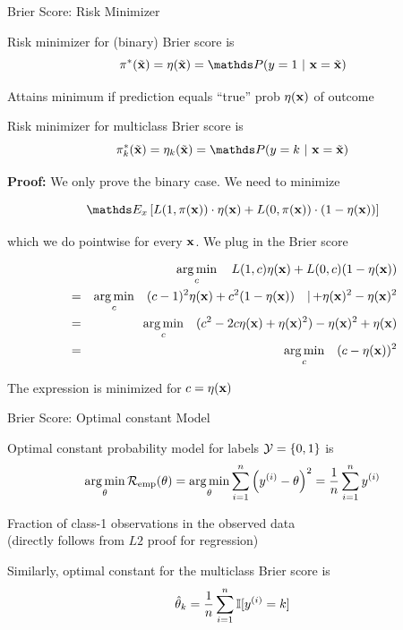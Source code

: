 \documentclass[11pt,compress,t,notes=noshow, xcolor=table]{beamer}
\begin{document}
\begin{vbframe}{Brier Score: Risk Minimizer}

\begin{itemizeL}
    \item Risk minimizer for (binary) Brier score is $$\piastxtil = \eta(\xtil) = \P(y=1~|~\xv = \xtil)$$
    \item Attains minimum if prediction equals \enquote{true} prob $\eta(\mathbf{x})$ of outcome
    \item Risk minimizer for multiclass Brier score is 
$$\pi^{\ast}_k(\xtil) = \eta_k(\xtil) =  \P(y = k ~|~ \xv = \xtil) $$
\end{itemizeL}

\framebreak
\textbf{Proof: } We only prove the binary case. We need to minimize 

$$
\E_x \left[L(1, \pix) \cdot \eta(\xv) + L(0, \pix) \cdot (1 - \eta(\xv)) \right]
$$

which we do pointwise for every $\mathbf{x}$. We plug in the Brier score

\vspace*{-0.3cm}

\begin{eqnarray*}
	&& \mathop{\mathrm{arg\,min}}_c \quad L(1, c) \eta(\mathbf{x}) + L(0, c) (1 - \eta(\mathbf{x})) \\ 
	&=&  \mathop{\mathrm{arg\,min}}_c \quad (c - 1)^2 \eta(\mathbf{x}) + c^2 (1 - \eta(\mathbf{x}))  \quad |{\,+\eta(\mathbf{x})^2-\eta(\mathbf{x})^2}\\
  &=&  \mathop{\mathrm{arg\,min}}_c \quad (c^2 -2c\eta(\mathbf{x}) + \eta(\mathbf{x})^2)- \eta(\mathbf{x})^2 + \eta(\mathbf{x}) \\
	&=&  \mathop{\mathrm{arg\,min}}_c \quad (c - \eta(\mathbf{x}))^2
\end{eqnarray*}

The expression is minimized for $c = \eta(\mathbf{x})$

\end{vbframe}

\begin{vbframe}{Brier Score: Optimal constant Model}

\begin{itemizeL}
    \item Optimal constant probability model for labels $\mathcal{Y} = \{0, 1\}$ is 
    $$\mathop{\mathrm{arg\,min}}_{\theta} \mathcal{R}_{\text{emp}}(\theta) = \mathop{\mathrm{arg\,min}}_{\theta} \sum\limits_{i=1}^n \left(y^{(i)} - \theta\right)^2 = \frac{1}{n} \sum\limits_{i=1}^n y^{(i)}$$
    \item Fraction of class-1 observations in the observed data\\ (directly follows from $L2$ proof for regression)
    \item Similarly, optimal constant for the multiclass Brier score is $$\hat{\theta}_k = \frac{1}{n}\sum\limits_{i=1}^n \mathbb{I} [y^{(i)} = k]$$
\end{itemizeL}

\end{vbframe}
\end{document}
